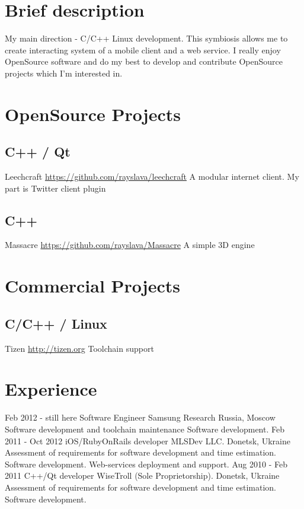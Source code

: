 \documentclass[11pt,a4paper]{moderncv}
\begin{document}
\maketitle

\section{Brief description}
\cvitem
  {}
  {My main direction - C/C++ Linux development.\newline{}
  This symbiosis allows me to create interacting system of a mobile client and a web service.\newline{}
  I really enjoy OpenSource software and do my best to develop and contribute OpenSource projects which I'm interested in.}

\section{OpenSource Projects}
\subsection{C++ / Qt}
\cvitem
  {Leechcraft}
  {\url{https://github.com/rayslava/leechcraft}\newline{}
  A modular internet client. My part is Twitter client plugin}
\subsection{C++}
\cvitem
  {Massacre}
  {\url{https://github.com/rayslava/Massacre}\newline{}
  A simple 3D engine}

\section{Commercial Projects}
  \subsection{C/C++ / Linux}
  \cvitem
    {Tizen}
    {\url{http://tizen.org}\newline{}
    Toolchain support}

\section{Experience}
\cventry
  {Feb 2012 - still here}
  {Software Engineer}
  {Samsung Research Russia, Moscow}
  {}{}
  {Software development and toolchain maintenance
  \newline{}Software development.}
\cventry
  {Feb 2011 - Oct 2012}
  {iOS/RubyOnRails developer}
  {MLSDev LLC. Donetsk, Ukraine}
  {}{}
  {Assessment of requirements for software development and time estimation. 
  \newline{}Software development.
  \newline{}Web-services deployment and support.}
\cventry
  {Aug 2010 - Feb 2011}
  {C++/Qt developer}
  {WiseTroll (Sole Proprietorship). Donetsk, Ukraine}
  {}{}
  {Assessment of requirements for software development and time estimation. 
  \newline{}Software development.}
\end{document}
